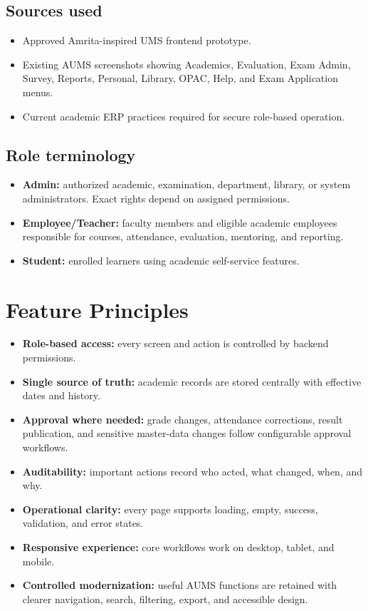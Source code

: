 \documentclass[10pt,a4paper]{article}
\begin{document}
\subsection{Sources used}
\begin{itemize}
  \item Approved Amrita-inspired UMS frontend prototype.
  \item Existing AUMS screenshots showing Academics, Evaluation, Exam Admin,
        Survey, Reports, Personal, Library, OPAC, Help, and Exam Application menus.
  \item Current academic ERP practices required for secure role-based operation.
\end{itemize}

\subsection{Role terminology}
\begin{itemize}
  \item \textbf{Admin:} authorized academic, examination, department, library,
        or system administrators. Exact rights depend on assigned permissions.
  \item \textbf{Employee/Teacher:} faculty members and eligible academic employees
        responsible for courses, attendance, evaluation, mentoring, and reporting.
  \item \textbf{Student:} enrolled learners using academic self-service features.
\end{itemize}

\section{Feature Principles}

\begin{itemize}
  \item \textbf{Role-based access:} every screen and action is controlled by backend permissions.
  \item \textbf{Single source of truth:} academic records are stored centrally with effective dates and history.
  \item \textbf{Approval where needed:} grade changes, attendance corrections, result publication,
        and sensitive master-data changes follow configurable approval workflows.
  \item \textbf{Auditability:} important actions record who acted, what changed, when, and why.
  \item \textbf{Operational clarity:} every page supports loading, empty, success, validation, and error states.
  \item \textbf{Responsive experience:} core workflows work on desktop, tablet, and mobile.
  \item \textbf{Controlled modernization:} useful AUMS functions are retained with clearer navigation,
        search, filtering, export, and accessible design.
\end{itemize}
\end{document}
